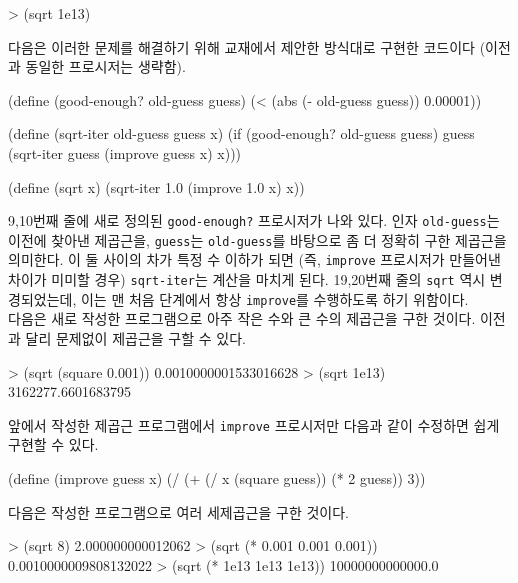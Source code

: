 \begin{lisp}
> (sqrt 1e13)
\end{lisp}

다음은 이러한 문제를 해결하기 위해 교재에서 제안한 방식대로 구현한 코드이다
(이전과 동일한 프로시저는 생략함).

\begin{lisp}
(define (good-enough? old-guess guess)
  (< (abs (- old-guess guess)) 0.00001))

(define (sqrt-iter old-guess guess x)
  (if (good-enough? old-guess guess)
      guess
      (sqrt-iter guess
                 (improve guess x)
                 x)))

(define (sqrt x)
  (sqrt-iter 1.0 (improve 1.0 x) x))
\end{lisp}

9,10번째 줄에 새로 정의된 \texttt{good-enough?} 프로시저가 나와 있다. 인자
\texttt{old-guess}는 이전에 찾아낸 제곱근을, \texttt{guess}는
\texttt{old-guess}를 바탕으로 좀 더 정확히 구한 제곱근을 의미한다. 이 둘
사이의 차가 특정 수 이하가 되면 (즉, \texttt{improve} 프로시저가 만들어낸
차이가 미미할 경우) \texttt{sqrt-iter}는 계산을 마치게 된다. 19,20번째 줄의
\texttt{sqrt} 역시 변경되었는데, 이는 맨 처음 단계에서 항상 \texttt{improve}를
수행하도록 하기 위함이다.\\

다음은 새로 작성한 프로그램으로 아주 작은 수와 큰 수의 제곱근을 구한
것이다. 이전과 달리 문제없이 제곱근을 구할 수 있다.
\begin{lisp}
> (sqrt (square 0.001))
0.0010000001533016628
> (sqrt 1e13)
3162277.6601683795
\end{lisp}


앞에서 작성한 제곱근 프로그램에서 \texttt{improve} 프로시저만 다음과 같이
수정하면 쉽게 구현할 수 있다.

\begin{lisp}
(define (improve guess x)
  (/ (+ (/ x (square guess)) (* 2 guess)) 3))
\end{lisp}

다음은 작성한 프로그램으로 여러 세제곱근을 구한 것이다.
\begin{lisp}
> (sqrt 8)
2.000000000012062
> (sqrt (* 0.001 0.001 0.001))
0.0010000009808132022
> (sqrt (* 1e13 1e13 1e13))
10000000000000.0
\end{lisp}

